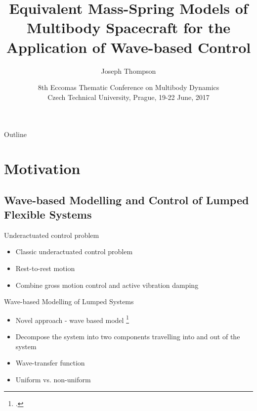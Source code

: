 \documentclass{beamer}
\title[Equivalent Mass-Spring Models]{Equivalent Mass-Spring Models of Multibody Spacecraft for the Application of Wave-based Control}
\author{Joseph Thompson} %
\institute[UCD, Ireland]{University College Dublin, Ireland}
\date[ECCOMAS MBD 2017] %
{8th Eccomas Thematic Conference on Multibody Dynamics \\ \vspace{8pt} \small{Czech Technical University, Prague, 19-22 June, 2017}}
\begin{document}
\begin{frame}
  \titlepage
\end{frame}
\begin{frame}{Outline}
  \tableofcontents
\end{frame}

\section{Motivation}

\subsection{Wave-based Modelling and Control of Lumped Flexible Systems}

\begin{frame}{Underactuated control problem}
\begin{itemize}
\item Classic underactuated control problem
\item Rest-to-rest motion
\item Combine gross motion control and active vibration damping
\end{itemize}

\end{frame}

\begin{frame}{Wave-based Modelling of Lumped Systems}
\begin{itemize}
\item Novel approach - wave based model \footcite{OConnor2011}
\item Decompose the system into two components travelling into and out of the system
\item Wave-transfer function
\item Uniform vs. non-uniform

\end{itemize}
\end{frame}
\end{document}

